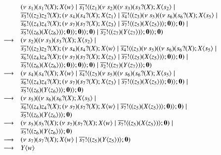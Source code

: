 \[
\begin{array}{ll}
	& (\nu\ s_1)( s_1 ? (X) ; X\langle w \rangle \;|\; \overline{s_1} ! \langle (z_1)(\nu\ s_2)((\nu\ s_3)( s_3 ? (X) ; X\langle s_2 \rangle \;|\; \\
	& \overline{s_3} ! \langle (z_2)z_2 ? (X) ; (\nu\ s_4)( s_4 ? (X) ; X\langle z_1 \rangle \;|\; \overline{s_4} ! \langle (z_3)(\nu\ s_5)( (\nu\ s_6)( s_6 ? (X) ; X\langle s_5 \rangle \;|\; \\
	& \overline{s_6} ! \langle (z_4)z_4 ? (X) ; (\nu\ s_7)( s_7 ? (X) ; X\langle z_3 \rangle \;|\; \overline{s_7} ! \langle (z_5)(X\langle z_5 \rangle) \rangle ; \mathbf{0}) \rangle ; \mathbf{0}) \;|\;\\
	&\overline{s_5} ! \langle (z_6)(X\langle z_6 \rangle) \rangle ; \mathbf{0} ) \rangle ; \mathbf{0}) \rangle ; \mathbf{0}) \;|\; \overline{s_2} ! \langle (z_7)(Y\langle z_7 \rangle) \rangle ;\mathbf{0} ) \rangle ; \mathbf{0})\\

	\longrightarrow &
	(\nu\ s_2)((\nu\ s_3)( s_3 ? (X) ; X\langle s_2 \rangle \;|\; \\
	& \overline{s_3} ! \langle (z_2)z_2 ? (X) ; (\nu\ s_4)( s_4 ? (X) ; X\langle w \rangle \;|\; \overline{s_4} ! \langle (z_3)(\nu\ s_5)( (\nu\ s_6)( s_6 ? (X) ; X\langle s_5 \rangle \;|\; \\
	& \overline{s_6} ! \langle (z_4)z_4 ? (X) ; (\nu\ s_7)( s_7 ? (X) ; X\langle z_3 \rangle \;|\; \overline{s_7} ! \langle (z_5)(X\langle z_5 \rangle) \rangle ; \mathbf{0}) \rangle ; \mathbf{0}) \;|\;\\
	&\overline{s_5} ! \langle (z_6)(X\langle z_6 \rangle) \rangle ; \mathbf{0} ) \rangle ; \mathbf{0}) \rangle ; \mathbf{0}) \;|\; \overline{s_2} ! \langle (z_7)(Y\langle z_7 \rangle) \rangle ;\mathbf{0} )\\

	\longrightarrow & (\nu\ s_4)(s_4 ? (X) ; X\langle w \rangle \;|\; \overline{s_4} ! \langle  (z_3)(\nu\ s_5)((\nu\ s_6)( s_6 ? (X) ; X\langle s_5 \rangle \;|\; \\
	& \overline{s_6} ! \langle (z_4)z_4 ? (X) ; (\nu\ s_7)( s_7 ? (X) ; X\langle z_3 \rangle \;|\;\overline{s_7} ! \langle (z_5)(X\langle z_5 \rangle) \rangle ; \mathbf{0}) \rangle ; \mathbf{0}) \;|\;\\
	& \overline{s_5} ! \langle (z_6)(Y\langle z_6 \rangle) \rangle ; \mathbf{0} ) \rangle ; \mathbf{0})\\

	\longrightarrow & (\nu\ s_5)((\nu\ s_6)( s_6 ? (X) ; X\langle s_5 \rangle \;|\; \\
	& \overline{s_6} ! \langle (z_4)z_4 ? (X) ; (\nu\ s_7)( s_7 ? (X) ; X\langle w \rangle \;|\;\overline{s_7} ! \langle (z_5)(X\langle z_5 \rangle) \rangle ; \mathbf{0}) \rangle ; \mathbf{0}) \;|\;\\
	& \overline{s_5} ! \langle (z_6)(Y\langle z_6 \rangle) \rangle ; \mathbf{0} )\\

	\longrightarrow & (\nu\ s_5)(s_5 ? (X) ; (\nu\ s_7)( s_7 ? (X) ; X\langle w \rangle \;|\;\overline{s_7} ! \langle (z_5)(X\langle z_5 \rangle) \rangle ; \mathbf{0}) \;|\;\\
	& \overline{s_5} ! \langle (z_6)(Y\langle z_6 \rangle) \rangle ; \mathbf{0} )\\

	\longrightarrow & (\nu\ s_7)( s_7 ? (X) ; X\langle w \rangle \;|\;\overline{s_7} ! \langle (z_5)(Y\langle z_5 \rangle) \rangle ; \mathbf{0})\\

	\longrightarrow & Y\langle w \rangle
\end{array}
\]
